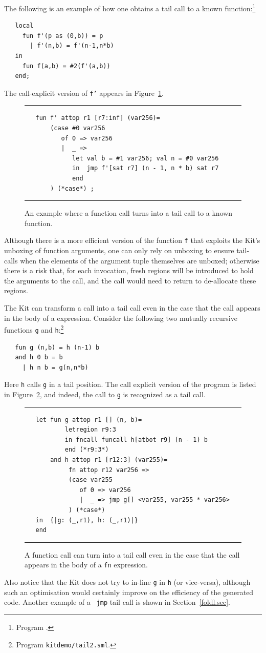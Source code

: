 \documentclass[12pt]{book}
\begin{document}
The following is an example of how one obtains a tail call to a known
function:\footnote{Program .}
\begin{verbatim}
   local
     fun f'(p as (0,b)) = p
       | f'(n,b) = f'(n-1,n*b)
   in
     fun f(a,b) = #2(f'(a,b))
   end;
\end{verbatim}
The call-explicit version of {\tt f'} appears in
Figure~\ref{tail.fig}.
\begin{figure}
\hrule \medskip
\begin{verbatim}
   fun f' attop r1 [r7:inf] (var256)= 
       (case #0 var256 
          of 0 => var256
          |  _ => 
             let val b = #1 var256; val n = #0 var256
             in  jmp f'[sat r7] (n - 1, n * b) sat r7
             end 
       ) (*case*) ; 
\end{verbatim}
\caption{An example where a function call turns into a tail call to a known function.}  
\medskip \hrule
\label{tail.fig}
\end{figure}

Although there is a more efficient version of the function {\tt f}
that exploits the Kit's unboxing of function arguments, one can only
rely on unboxing to ensure tail-calls when the elements of the
argument tuple themselves are unboxed; otherwise there is a risk that,
for each invocation, fresh regions will be introduced to hold the
arguments to the call, and the call would need to return to
de-allocate these regions.

The Kit can transform a call into a  tail call even in the
case that the call appears in the body of a  expression.
Consider the following two mutually recursive functions {\tt g} and
{\tt h}:\footnote{Program {\tt kitdemo/tail2.sml}.}
\begin{verbatim}
   fun g (n,b) = h (n-1) b
   and h 0 b = b
     | h n b = g(n,n*b)
\end{verbatim}
Here {\tt h} calls {\tt g} in a tail position. The call explicit
version of the program is listed in Figure~\ref{tail2.fig}, and
indeed, the call to {\tt g} is recognized as a tail call.
\begin{figure}
\hrule \medskip
\begin{verbatim}
   let fun g attop r1 [] (n, b)= 
           letregion r9:3 
           in fncall funcall h[atbot r9] (n - 1) b 
           end (*r9:3*)
       and h attop r1 [r12:3] (var255)= 
            fn attop r12 var256 => 
            (case var255 
               of 0 => var256
               |  _ => jmp g[] <var255, var255 * var256>
            ) (*case*) 
   in  {|g: (_,r1), h: (_,r1)|}
   end 
\end{verbatim}
\caption{A function call can turn into a tail call even 
  in the case that the call appears in the body of a {\tt fn} expression.}  
\medskip \hrule
\label{tail2.fig}
\end{figure}
Also notice that the Kit does not try to in-line {\tt g} in {\tt h}
(or vice-versa), although such an optimisation would certainly improve
on the efficiency of the generated code. Another example of a {\tt
  jmp} tail call is shown in Section~\ref{foldl.sec}.
\end{document}
